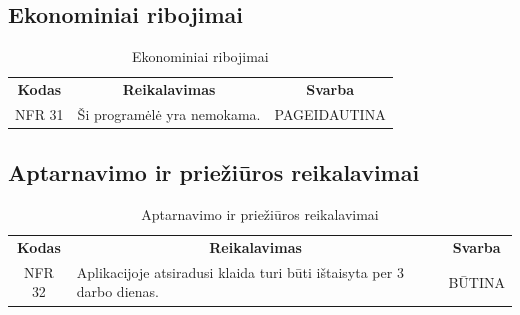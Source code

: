 \documentclass{VUMIFPSkursinis}
\begin{document}
{{{{{\begin{center}
\begin{table}[H]
\begin{tabular}{|p{2cm}|p{}|p{}|}
	\hline 	
	
	\end{tabular}
	
	\label{table:Sistemosįsisavinamumoreikalavimai}
	\end{table}

\end{center}

\subsection{Ekonominiai ribojimai}
\begin{center}
	\begin{table}[H]
	\caption{Ekonominiai ribojimai}
	\begin{tabular}{|p{2cm}|p{}|p{}|}
	\hline
	    \rowcolor{lightgray}
		\multicolumn{3}{|c|}{Ekonominiai ribojimai}\\
		
	\hline
		\multicolumn{1}{|c|}{{\bfseries Kodas}}&
		\multicolumn{1}{|c|}{{\bfseries Reikalavimas}}&
		\multicolumn{1}{|c|}{{\bfseries Svarba}}\\
	\hline 	
		\multicolumn{1}{|c|}{NFR 31}&
		{Ši programėlė yra nemokama.}&
		\multicolumn{1}{|p{1.5cm}|}{PAGEIDAUTINA}\\	
	
	\hline
	
	
	\end{tabular}
	
	\label{table:Ekonominiairibojimai}
	\end{table}

\end{center}

\subsection{Aptarnavimo ir priežiūros reikalavimai}
\begin{center}
	\begin{table}[H]
	\caption{Aptarnavimo ir priežiūros reikalavimai}
	\begin{tabular}{|p{2cm}|p{}|p{}|}
	\hline
	    \rowcolor{lightgray}
		\multicolumn{3}{|c|}{Aptarnavimo ir priežiūros reikalavimai}\\
		
	\hline
		\multicolumn{1}{|c|}{{\bfseries Kodas}}&
		\multicolumn{1}{|c|}{{\bfseries Reikalavimas}}&
		\multicolumn{1}{|c|}{{\bfseries Svarba}}\\
	\hline 	
		\multicolumn{1}{|c|}{NFR 32}&
		{Aplikacijoje atsiradusi klaida turi būti ištaisyta per 3 darbo dienas.}&
		\multicolumn{1}{|c|}{BŪTINA}\\	
	

\end{tabular}
\end{table}
\end{center}}}}}}
\end{document}

